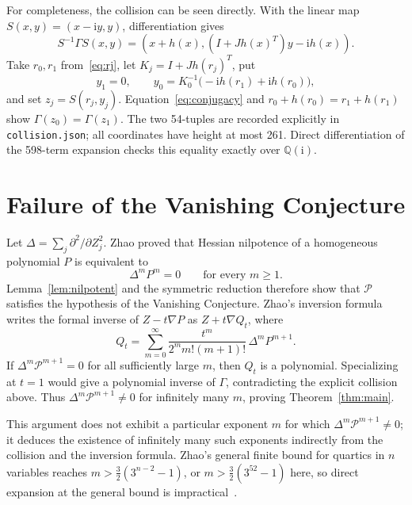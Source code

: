 \documentclass[11pt]{article}
\newcommand{\Q}{\mathbb Q}
\newcommand{\cP}{\mathcal P}
\newcommand{\ii}{\mathrm i}
\begin{document}
For completeness, the collision can be seen directly.  With the linear map
$S(x,y)=(x-\ii y,y)$, differentiation gives
\begin{equation}
 S^{-1}\Gamma S(x,y)=
 \left(x+h(x),(I+Jh(x)^T)y-\ii h(x)\right).
 \label{eq:conjugacy}
\end{equation}
Take $r_0,r_1$ from~\eqref{eq:rj}, let $K_j=I+Jh(r_j)^T$, put
\begin{equation}
 y_1=0,\qquad y_0=K_0^{-1}\bigl(-\ii h(r_1)+\ii h(r_0)\bigr),
\end{equation}
and set $z_j=S(r_j,y_j)$.  Equation~\eqref{eq:conjugacy} and
$r_0+h(r_0)=r_1+h(r_1)$ show $\Gamma(z_0)=\Gamma(z_1)$.  The two 54-tuples
are recorded explicitly in \texttt{collision.json}; all coordinates have
height at most 261.  Direct differentiation of the 598-term expansion checks
this equality exactly over $\Q(\ii)$.

\section{Failure of the Vanishing Conjecture}

Let $\Delta=\sum_j\partial^2/\partial Z_j^2$.  Zhao proved
\cite{zhao} that Hessian nilpotence of a homogeneous polynomial $P$ is
equivalent to
\begin{equation}
  \Delta^mP^m=0\qquad\text{for every }m\geq1.
  \label{eq:zhao-hypothesis}
\end{equation}
Lemma~\ref{lem:nilpotent} and the symmetric reduction therefore show that
$\cP$ satisfies the hypothesis of the Vanishing Conjecture.  Zhao's inversion
formula writes the formal inverse of $Z-t\nabla P$ as $Z+t\nabla Q_t$, where
\begin{equation}
 Q_t=\sum_{m=0}^{\infty}
 \frac{t^m}{2^m m!(m+1)!}\,\Delta^mP^{m+1}.
 \label{eq:zhao-series}
\end{equation}
If $\Delta^m\cP^{m+1}=0$ for all sufficiently large $m$, then $Q_t$ is a
polynomial.  Specializing at $t=1$ would give a polynomial inverse of
$\Gamma$, contradicting the explicit collision above.  Thus
$\Delta^m\cP^{m+1}\ne0$ for infinitely many $m$, proving
Theorem~\ref{thm:main}.

This argument does not exhibit a particular exponent $m$ for which
$\Delta^m\cP^{m+1}\ne0$; it deduces the existence of infinitely many such
exponents indirectly from the collision and the inversion formula.  Zhao's
general finite bound for quartics in $n$ variables reaches
$m>\frac32(3^{n-2}-1)$, or $m>\frac32(3^{52}-1)$ here, so direct expansion at
the general bound is impractical~\cite{zhao}.
\end{document}

